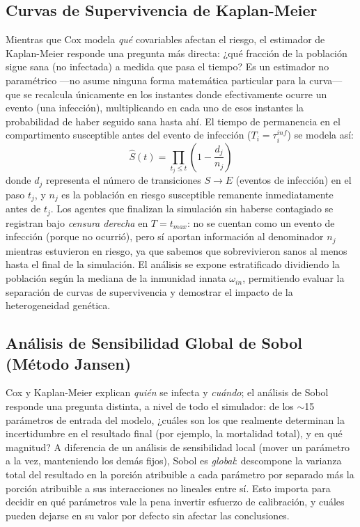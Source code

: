 \documentclass[conference]{IEEEtran}
\begin{document}
\subsection{Curvas de Supervivencia de Kaplan-Meier}
Mientras que Cox modela \emph{qué} covariables afectan el riesgo, el estimador de Kaplan-Meier responde una pregunta más directa: ¿qué fracción de la población sigue sana (no infectada) a medida que pasa el tiempo? Es un estimador no paramétrico ---no asume ninguna forma matemática particular para la curva--- que se recalcula únicamente en los instantes donde efectivamente ocurre un evento (una infección), multiplicando en cada uno de esos instantes la probabilidad de haber seguido sana hasta ahí. El tiempo de permanencia en el compartimento susceptible antes del evento de infección ($T_i=\tau_i^{inf}$) se modela así:
\begin{equation}
\hat{S}(t) = \prod_{t_j \le t} \left(1 - \frac{d_j}{n_j}\right)
\end{equation}
donde $d_j$ representa el número de transiciones $S\to E$ (eventos de infección) en el paso $t_j$, y $n_j$ es la población en riesgo susceptible remanente inmediatamente antes de $t_j$. Los agentes que finalizan la simulación sin haberse contagiado se registran bajo \emph{censura derecha} en $T=t_{max}$: no se cuentan como un evento de infección (porque no ocurrió), pero sí aportan información al denominador $n_j$ mientras estuvieron en riesgo, ya que sabemos que sobrevivieron sanos al menos hasta el final de la simulación. El análisis se expone estratificado dividiendo la población según la mediana de la inmunidad innata $\omega_{in}$, permitiendo evaluar la separación de curvas de supervivencia y demostrar el impacto de la heterogeneidad genética.

\subsection{Análisis de Sensibilidad Global de Sobol (Método Jansen)}
Cox y Kaplan-Meier explican \emph{quién} se infecta y \emph{cuándo}; el análisis de Sobol responde una pregunta distinta, a nivel de todo el simulador: de los $\sim$15 parámetros de entrada del modelo, ¿cuáles son los que realmente determinan la incertidumbre en el resultado final (por ejemplo, la mortalidad total), y en qué magnitud? A diferencia de un análisis de sensibilidad local (mover un parámetro a la vez, manteniendo los demás fijos), Sobol es \emph{global}: descompone la varianza total del resultado en la porción atribuible a cada parámetro por separado más la porción atribuible a sus interacciones no lineales entre sí. Esto importa para decidir en qué parámetros vale la pena invertir esfuerzo de calibración, y cuáles pueden dejarse en su valor por defecto sin afectar las conclusiones.
\end{document}
